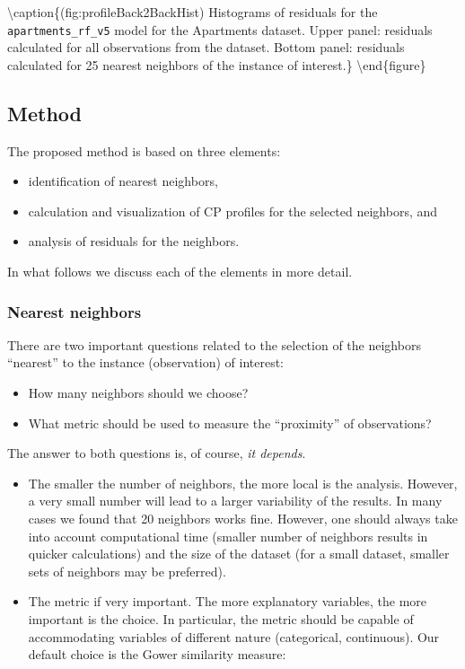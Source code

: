 \documentclass[12pt,]{krantz}
\providecommand{\tightlist}{%
  \setlength{\itemsep}{0pt}\setlength{\parskip}{0pt}}
\theoremstyle{definition}
\theoremstyle{definition}
\theoremstyle{definition}
\theoremstyle{remark}
\begin{document}
\textbackslash{}caption\{(fig:profileBack2BackHist) Histograms of
residuals for the \texttt{apartments\_rf\_v5} model for the Apartments
dataset. Upper panel: residuals calculated for all observations from the
dataset. Bottom panel: residuals calculated for 25 nearest neighbors of
the instance of interest.\}\label{fig:profileBack2BackHist}
\textbackslash{}end\{figure\}

\hypertarget{cPLocDiagMethod}{%
\subsection{Method}\label{cPLocDiagMethod}}

The proposed method is based on three elements:

\begin{itemize}
\tightlist
\item
  identification of nearest neighbors,
\item
  calculation and visualization of CP profiles for the selected
  neighbors, and
\item
  analysis of residuals for the neighbors.
\end{itemize}

In what follows we discuss each of the elements in more detail.

\hypertarget{cPLocDiagNeighbors}{%
\subsubsection{Nearest neighbors}\label{cPLocDiagNeighbors}}

There are two important questions related to the selection of the
neighbors ``nearest'' to the instance (observation) of interest:

\begin{itemize}
\tightlist
\item
  How many neighbors should we choose?
\item
  What metric should be used to measure the ``proximity'' of
  observations?
\end{itemize}

The answer to both questions is, of course, \emph{it depends}.

\begin{itemize}
\tightlist
\item
  The smaller the number of neighbors, the more local is the analysis.
  However, a very small number will lead to a larger variability of the
  results. In many cases we found that 20 neighbors works fine. However,
  one should always take into account computational time (smaller number
  of neighbors results in quicker calculations) and the size of the
  dataset (for a small dataset, smaller sets of neighbors may be
  preferred).
\item
  The metric if very important. The more explanatory variables, the more
  important is the choice. In particular, the metric should be capable
  of accommodating variables of different nature (categorical,
  continuous). Our default choice is the Gower similarity measure:
\end{itemize}
\end{document}
